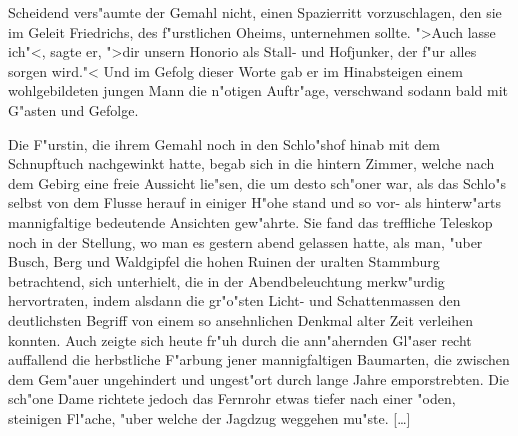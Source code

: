 \documentclass[ddc]{tudform}
\begin{document}
Scheidend vers"aumte der Gemahl nicht, einen Spazierritt vorzuschlagen, den sie 
im
Geleit Friedrichs, des f"urstlichen Oheims, unternehmen sollte. ">Auch lasse 
ich"<,
sagte er, ">dir unsern Honorio als Stall- und Hofjunker, der f"ur alles sorgen 
wird."<
Und im Gefolg dieser Worte gab er im Hinabsteigen einem wohlgebildeten jungen 
Mann die
n"otigen Auftr"age, verschwand sodann bald mit G"asten und Gefolge.

Die F"urstin, die ihrem Gemahl noch in den Schlo"shof hinab mit dem Schnupftuch
nachgewinkt hatte, begab sich in die hintern Zimmer, welche nach dem Gebirg 
eine freie
Aussicht lie"sen, die um desto sch"oner war, als das Schlo"s selbst von dem 
Flusse herauf
in einiger H"ohe stand und so vor- als hinterw"arts mannigfaltige bedeutende 
Ansichten
gew"ahrte. Sie fand das treffliche Teleskop noch in der Stellung, wo man es 
gestern abend
gelassen hatte, als man, "uber Busch, Berg und Waldgipfel die hohen Ruinen der 
uralten
Stammburg betrachtend, sich unterhielt, die in der Abendbeleuchtung merkw"urdig
hervortraten, indem alsdann die gr"o"sten Licht- und Schattenmassen den 
deutlichsten
Begriff von einem so ansehnlichen Denkmal alter Zeit verleihen konnten. Auch 
zeigte sich
heute fr"uh durch die ann"ahernden Gl"aser recht auffallend die herbstliche 
F"arbung jener
mannigfaltigen Baumarten, die zwischen dem Gem"auer ungehindert und ungest"ort 
durch lange
Jahre emporstrebten. Die sch"one Dame richtete jedoch das Fernrohr etwas tiefer 
nach einer
"oden, steinigen Fl"ache, "uber welche der Jagdzug weggehen mu"ste. [\ldots]
\end{document}
